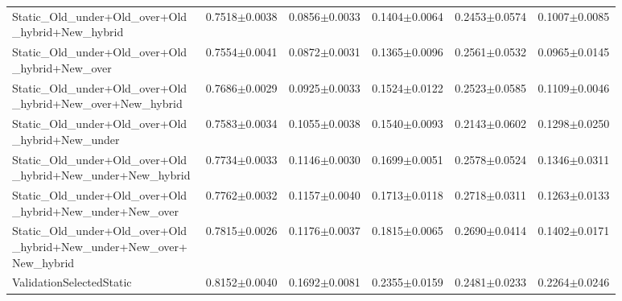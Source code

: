 \begin{longtable}{p{0.28\linewidth}p{0.12\linewidth}p{0.12\linewidth}p{0.12\linewidth}p{0.12\linewidth}p{0.12\linewidth}}
Static\_\allowbreak{}Old\_\allowbreak{}under+Old\_\allowbreak{}over+Old\_\allowbreak{}hybrid+New\_\allowbreak{}hybrid & 0.7518\(\pm\)0.0038 & 0.0856\(\pm\)0.0033 & 0.1404\(\pm\)0.0064 & 0.2453\(\pm\)0.0574 & 0.1007\(\pm\)0.0085 \\
Static\_\allowbreak{}Old\_\allowbreak{}under+Old\_\allowbreak{}over+Old\_\allowbreak{}hybrid+New\_\allowbreak{}over & 0.7554\(\pm\)0.0041 & 0.0872\(\pm\)0.0031 & 0.1365\(\pm\)0.0096 & 0.2561\(\pm\)0.0532 & 0.0965\(\pm\)0.0145 \\
Static\_\allowbreak{}Old\_\allowbreak{}under+Old\_\allowbreak{}over+Old\_\allowbreak{}hybrid+New\_\allowbreak{}over+New\_\allowbreak{}hybrid & 0.7686\(\pm\)0.0029 & 0.0925\(\pm\)0.0033 & 0.1524\(\pm\)0.0122 & 0.2523\(\pm\)0.0585 & 0.1109\(\pm\)0.0046 \\
Static\_\allowbreak{}Old\_\allowbreak{}under+Old\_\allowbreak{}over+Old\_\allowbreak{}hybrid+New\_\allowbreak{}under & 0.7583\(\pm\)0.0034 & 0.1055\(\pm\)0.0038 & 0.1540\(\pm\)0.0093 & 0.2143\(\pm\)0.0602 & 0.1298\(\pm\)0.0250 \\
Static\_\allowbreak{}Old\_\allowbreak{}under+Old\_\allowbreak{}over+Old\_\allowbreak{}hybrid+New\_\allowbreak{}under+New\_\allowbreak{}hybrid & 0.7734\(\pm\)0.0033 & 0.1146\(\pm\)0.0030 & 0.1699\(\pm\)0.0051 & 0.2578\(\pm\)0.0524 & 0.1346\(\pm\)0.0311 \\
Static\_\allowbreak{}Old\_\allowbreak{}under+Old\_\allowbreak{}over+Old\_\allowbreak{}hybrid+New\_\allowbreak{}under+New\_\allowbreak{}over & 0.7762\(\pm\)0.0032 & 0.1157\(\pm\)0.0040 & 0.1713\(\pm\)0.0118 & 0.2718\(\pm\)0.0311 & 0.1263\(\pm\)0.0133 \\
Static\_\allowbreak{}Old\_\allowbreak{}under+Old\_\allowbreak{}over+Old\_\allowbreak{}hybrid+New\_\allowbreak{}under+New\_\allowbreak{}over+New\_\allowbreak{}hybrid & 0.7815\(\pm\)0.0026 & 0.1176\(\pm\)0.0037 & 0.1815\(\pm\)0.0065 & 0.2690\(\pm\)0.0414 & 0.1402\(\pm\)0.0171 \\
ValidationSelectedStatic & 0.8152\(\pm\)0.0040 & 0.1692\(\pm\)0.0081 & 0.2355\(\pm\)0.0159 & 0.2481\(\pm\)0.0233 & 0.2264\(\pm\)0.0246 \\
\end{longtable}
\endgroup
